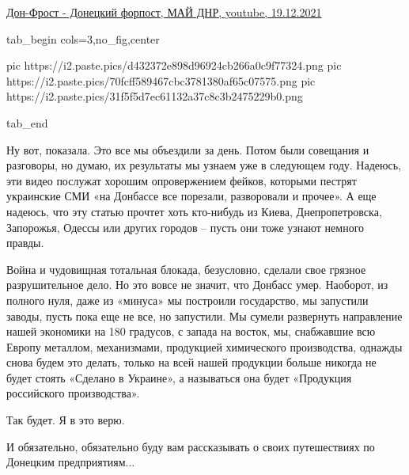 \href{https://www.youtube.com/watch?v=sEgLxBdp52k}{%
Дон-Фрост - Донецкий форпост, МАЙ ДНР, youtube, 19.12.2021%
}


\ifcmt
  tab_begin cols=3,no_fig,center

     pic https://i2.paste.pics/d432372e898d96924cb266a0c9f77324.png
		 pic https://i2.paste.pics/70fcff589467cbc3781380af65c07575.png
		 pic https://i2.paste.pics/31f5f5d7ec61132a37c8c3b2475229b0.png

  tab_end
\fi

Ну вот, показала. Это все мы объездили за день. Потом были совещания и
разговоры, но думаю, их результаты мы узнаем уже в следующем году. Надеюсь, эти
видео послужат хорошим опровержением фейков, которыми пестрят украинские СМИ
«на Донбассе все порезали, разворовали и прочее». А еще надеюсь, что эту статью
прочтет хоть кто-нибудь из Киева, Днепропетровска, Запорожья, Одессы или других
городов – пусть они тоже узнают немного правды.


Война и чудовищная тотальная блокада, безусловно, сделали свое грязное
разрушительное дело. Но это вовсе не значит, что Донбасс умер. Наоборот, из
полного нуля, даже из «минуса» мы построили государство, мы запустили заводы,
пусть пока еще не все, но запустили. Мы сумели развернуть направление нашей
экономики на 180 градусов, с запада на восток, мы, снабжавшие всю Европу
металлом, механизмами, продукцией химического производства, однажды снова будем
это делать, только на всей нашей продукции больше никогда не будет стоять
«Сделано в Украине», а называться она будет «Продукция российского
производства».

Так будет. Я в это верю.

И обязательно, обязательно буду вам рассказывать о своих путешествиях по
Донецким предприятиям...


